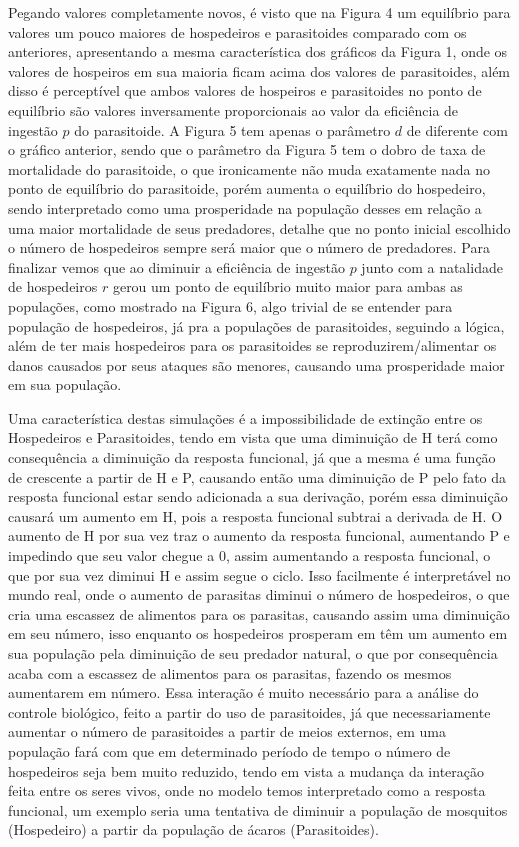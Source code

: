 Pegando valores completamente novos, é visto que na Figura 4 um equilíbrio para valores um pouco maiores de hospedeiros e parasitoides comparado com os anteriores, apresentando a mesma característica dos gráficos da Figura 1, onde os valores de hospeiros em sua maioria ficam acima dos valores de parasitoides, além disso é perceptível que ambos valores de hospeiros e parasitoides no ponto de equilíbrio são valores inversamente proporcionais ao valor da eficiência de ingestão $p$ do parasitoide. A Figura 5 tem apenas o parâmetro $d$ de diferente com o gráfico anterior,  sendo que o parâmetro da Figura 5 tem o dobro de taxa de mortalidade do parasitoide, o que ironicamente não muda exatamente nada no ponto de equilíbrio do parasitoide, porém aumenta o equilíbrio do hospedeiro, sendo interpretado como uma prosperidade na população desses em relação a uma maior mortalidade de seus predadores, detalhe que no ponto inicial escolhido o número de hospedeiros sempre será maior que o número de predadores. Para finalizar vemos que ao diminuir a eficiência de ingestão $p$ junto com a natalidade de hospedeiros $r$ gerou um ponto de equilíbrio muito maior para ambas as populações, como mostrado na Figura 6, algo trivial  de se entender para população de hospedeiros, já  pra a populações de parasitoides, seguindo a lógica, além de ter mais hospedeiros para os parasitoides se reproduzirem/alimentar os danos causados por seus ataques são menores, causando uma prosperidade maior em sua população.

Uma característica destas simulações  é a impossibilidade de extinção entre os Hospedeiros e Parasitoides, tendo em vista que uma diminuição de H terá como consequência a diminuição da resposta funcional, já que a mesma é uma função de crescente a partir de H e P, causando então uma diminuição de P pelo fato da resposta funcional estar sendo adicionada a sua derivação, porém essa diminuição causará um aumento em H, pois a resposta funcional subtrai a derivada de H. O aumento de H por sua vez traz o aumento da resposta funcional,  aumentando P e impedindo que seu valor chegue a 0, assim aumentando a resposta funcional, o que por sua vez diminui H e assim segue o ciclo.  Isso facilmente é  interpretável no mundo real, onde o aumento de parasitas diminui o número de hospedeiros, o que cria uma escassez de alimentos para os parasitas, causando assim uma diminuição em seu número, isso enquanto os hospedeiros prosperam em têm um aumento em sua população pela diminuição de seu predador natural, o que por consequência acaba com a escassez de alimentos para os parasitas, fazendo os mesmos aumentarem em número. Essa interação é  muito necessário  para a análise do controle biológico, feito a partir do uso de parasitoides, já que necessariamente aumentar o número de parasitoides a partir de meios externos, em uma população fará com que em determinado período de tempo o número de hospedeiros seja bem muito reduzido, tendo em vista a mudança da interação feita entre os seres vivos, onde no modelo temos interpretado como a resposta funcional, um exemplo seria uma tentativa de diminuir a população de mosquitos (Hospedeiro) a partir da população de ácaros (Parasitoides).


